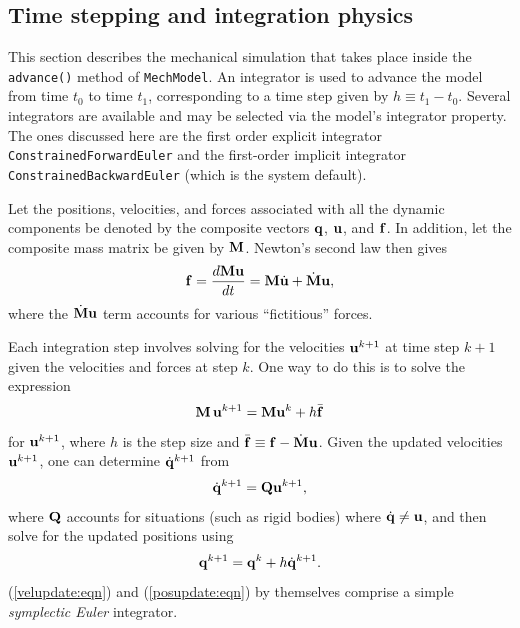 \subsection{Time stepping and integration physics}
\label{PhysicsSimulation:sec}

This section describes the mechanical simulation that takes place inside the
{\tt advance()} method of {\tt MechModel}. An integrator is used to advance the
model from time $t_0$ to time $t_1$, corresponding to a time step given by
$h \equiv t_1 - t_0$. Several integrators are available and may be selected via
the model's {\sf integrator} property. The ones discussed here are the
first order explicit integrator {\tt ConstrainedForwardEuler} and
the first-order implicit integrator {\tt ConstrainedBackwardEuler} (which
is the system default).

Let the positions, velocities, and forces associated with all the dynamic
components be denoted by the composite vectors ${\bf q}$, ${\bf u}$, and ${\bf f}$.  In
addition, let the composite mass matrix be given by ${\bf M}$.  Newton's second law
then gives
\begin{equation}
{\bf f} = \frac{d {\bf M} {\bf u}}{d t} = {\bf M} \dot{{\bf u}} + \dot{{\bf M}} {\bf u},
\label{newton:eqn}
\end{equation}
%
where the $\dot{{\bf M}} {\bf u}$ term accounts for various ``fictitious'' forces.

Each integration step involves solving for
the velocities ${\bf u}^{k+1}$ at time step $k+1$ given the velocities and forces
at step $k$. One way to do this is to solve the expression
%
\begin{equation}
{\bf M} \, {\bf u}^{k+1} = {\bf M} {\bf u}^k + h \bar{{\bf f}}
\label{velupdate:eqn}
\end{equation}
%
for ${\bf u}^{k+1}$, where $h$ is the step size and 
$\bar{{\bf f}} \equiv {\bf f} - \dot{{\bf M}} {\bf u}$. Given the updated velocities ${\bf u}^{k+1}$, one can
determine $\dot{{\bf q}}^{k+1}$ from
%
\begin{equation}
\dot{{\bf q}}^{k+1} = {\bf Q} {\bf u}^{k+1},
\end{equation}
%
where ${\bf Q}$ accounts for situations (such as rigid bodies) where
$\dot{{\bf q}} \ne {\bf u}$, and then solve for the updated positions using
%
\begin{equation}
{\bf q}^{k+1} = {\bf q}^k + h \dot {{\bf q}}^{k+1}.
\label{posupdate:eqn}
\end{equation}
%
(\ref{velupdate:eqn}) and (\ref{posupdate:eqn}) by themselves comprise a
simple {\it symplectic Euler} integrator.

